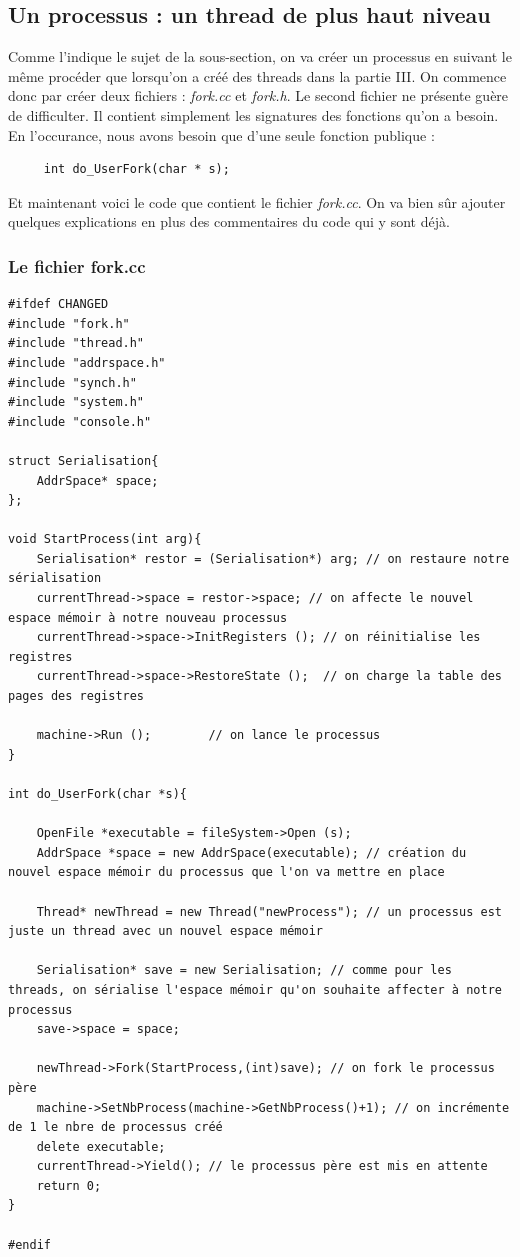 \documentclass[a4paper,10pt]{article}
\begin{document}
    \textcolor{NavyBlue}{\subsection{Un processus : un thread de plus haut niveau}}
    Comme l'indique le sujet de la sous-section, on va créer un processus en suivant le même procéder que lorsqu'on a créé des threads dans la partie III.
    On commence donc par créer deux fichiers : \emph{fork.cc} et \emph{fork.h}. Le second fichier ne présente guère de difficulter. Il contient simplement
    les signatures des fonctions qu'on a besoin. En l'occurance, nous avons besoin que d'une seule fonction publique :
    \begin{lstlisting}
     int do_UserFork(char * s);
    \end{lstlisting}
    Et maintenant voici le code que contient le fichier \emph{fork.cc}. On va bien sûr ajouter quelques explications en plus des commentaires du code qui 
    y sont déjà.
    \textcolor{TealBlue}{\subsubsection*{Le fichier fork.cc}}
    \begin{lstlisting}
#ifdef CHANGED
#include "fork.h"
#include "thread.h"
#include "addrspace.h"
#include "synch.h"
#include "system.h"
#include "console.h"

struct Serialisation{
	AddrSpace* space;
};

void StartProcess(int arg){
	Serialisation* restor = (Serialisation*) arg; // on restaure notre sérialisation 
	currentThread->space = restor->space; // on affecte le nouvel espace mémoir à notre nouveau processus
	currentThread->space->InitRegisters ();	// on réinitialise les registres
	currentThread->space->RestoreState ();	// on charge la table des pages des registres

	machine->Run ();		// on lance le processus
}

int do_UserFork(char *s){

	OpenFile *executable = fileSystem->Open (s);
	AddrSpace *space = new AddrSpace(executable); // création du nouvel espace mémoir du processus que l'on va mettre en place

	Thread* newThread = new Thread("newProcess"); // un processus est juste un thread avec un nouvel espace mémoir
  
	Serialisation* save = new Serialisation; // comme pour les threads, on sérialise l'espace mémoir qu'on souhaite affecter à notre processus
	save->space = space;

	newThread->Fork(StartProcess,(int)save); // on fork le processus père
	machine->SetNbProcess(machine->GetNbProcess()+1); // on incrémente de 1 le nbre de processus créé
	delete executable;
	currentThread->Yield(); // le processus père est mis en attente
	return 0;
}

#endif 

    \end{lstlisting}
\end{document}
